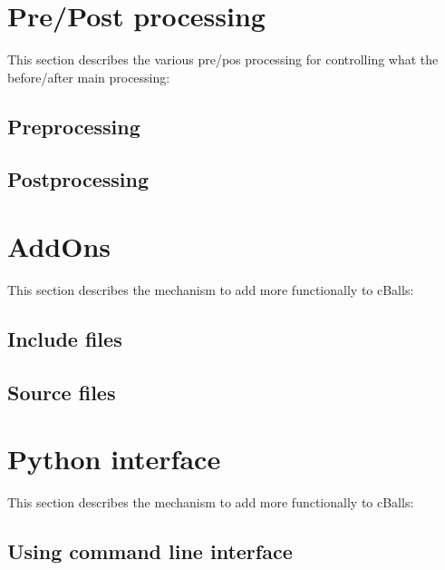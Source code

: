 \documentclass[letterpaper,10pt,english]{sphinxmanual}
\begin{document}
\sphinxstepscope


\chapter{Pre/Post processing}
\label{\detokenize{pre_post_process:pre-post-processing}}\label{\detokenize{pre_post_process::doc}}
\sphinxAtStartPar
This section describes the various pre/pos processing for controlling
what the  before/after main processing:


\section{Pre\sphinxhyphen{}processing}
\label{\detokenize{pre_post_process:pre-processing}}

\section{Post\sphinxhyphen{}processing}
\label{\detokenize{pre_post_process:post-processing}}
\sphinxstepscope


\chapter{AddOn\textquotesingle{}s}
\label{\detokenize{addons:addon-s}}\label{\detokenize{addons::doc}}
\sphinxAtStartPar
This section describes the mechanism to add more functionally to cBalls:


\section{Include files}
\label{\detokenize{addons:include-files}}

\section{Source files}
\label{\detokenize{addons:source-files}}
\sphinxstepscope


\chapter{Python interface}
\label{\detokenize{python:python-interface}}\label{\detokenize{python::doc}}
\sphinxAtStartPar
This section describes the mechanism to add more functionally to cBalls:


\section{Using command line interface}
\label{\detokenize{python:using-command-line-interface}}
\end{document}
